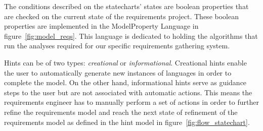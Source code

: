 The conditions described on the statecharts' states are boolean properties that
are checked on the current state of the requirements project. These boolean
properties are implemented in the \textsf{ModelProperty} Language in
figure~\ref{fig:model_reqs}. This language is dedicated to holding the
algorithms that run the analyses required for our specific requirements
gathering system.


Hints can be of two types: \emph{creational} or \emph{informational}.
Creational hints enable the user to automatically generate new instances of
languages in order to complete the model. On the other hand, informational hints
serve as guidance steps to the user but are not associated with automatic
actions. This means the requirements engineer has to manually perform a set of
actions in order to further refine the requirements model and reach the next
state of refinement of the requirements model as defined in the hint model in
figure~\ref{fig:flow_statechart}. 





